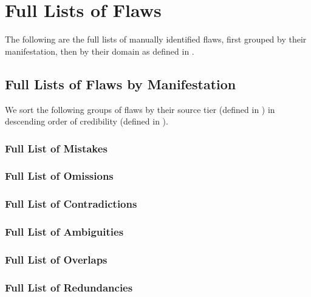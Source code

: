 \chapter{Full Lists of Flaws}\label{flaws-full}

The following are the full lists of manually identified flaws, first grouped
by their manifestation, then by their domain as defined in .

\section{Full Lists of Flaws by Manifestation}\label{flawMnfsts-full}

We sort the following groups of flaws by their source tier (defined in
) in descending order of credibility (defined in
).

\subsection{Full List of Mistakes}\label{wrong-full}


\subsection{Full List of Omissions}\label{miss-full}


\subsection{Full List of Contradictions}\label{contra-full}


\subsection{Full List of Ambiguities}\label{ambi-full}


\subsection{Full List of Overlaps}\label{over-full}


\subsection{Full List of Redundancies}\label{redun-full}


